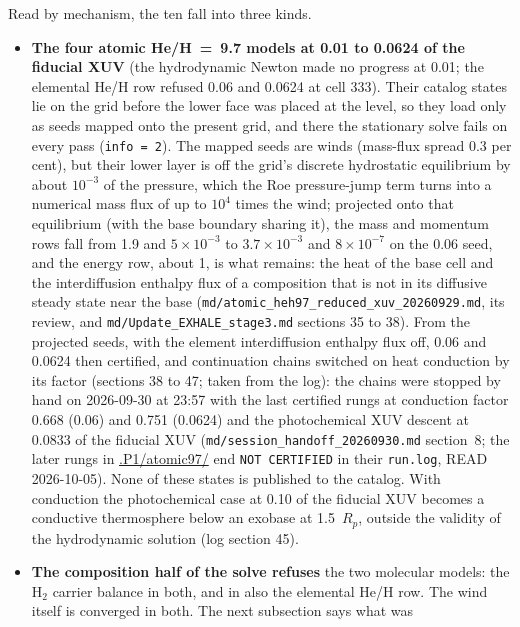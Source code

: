 \documentclass[11pt]{my_memo}
\newcommand{\case}[1]{\seqsplit{#1}}
\begin{document}
\noindent
Read by mechanism, the ten fall into three kinds.
\begin{itemize}
\item \textbf{The four atomic He/H~=~9.7 models at 0.01 to 0.0624 of the
      fiducial XUV} (the hydrodynamic Newton made no progress at 0.01; the
      elemental He/H row refused 0.06 and 0.0624 at cell 333). Their catalog
      states lie on the grid before the lower face was placed at the level,
      so they load only as seeds mapped onto the present grid, and there the
      stationary solve fails on every pass (\texttt{info~=~2}). The mapped
      seeds are winds (mass-flux spread 0.3 per cent), but their lower
      layer is off the grid's discrete hydrostatic equilibrium by about
      $10^{-3}$ of the pressure, which the Roe pressure-jump term turns into
      a numerical mass flux of up to $10^{4}$ times the wind; projected onto
      that equilibrium (with the base boundary sharing it), the mass and
      momentum rows fall from 1.9 and $5\times10^{-3}$ to
      $3.7\times10^{-3}$ and $8\times10^{-7}$ on the 0.06 seed, and the energy
      row, about 1, is what remains: the heat of the base cell and the
      interdiffusion enthalpy flux of a composition that is not in its
      diffusive steady state near the base
      (\texttt{md/atomic\_heh97\_reduced\_xuv\_20260929.md}, its review, and
      \texttt{md/Update\_EXHALE\_stage3.md} sections 35 to 38). From the
      projected seeds, with the element interdiffusion enthalpy flux off,
      0.06 and 0.0624 then certified, and continuation chains switched on
      heat conduction by its factor (sections 38 to 47; taken from the log):
      the chains were stopped by hand on 2026-09-30 at 23:57 with the last
      certified rungs at conduction factor 0.668 (0.06) and 0.751 (0.0624)
      and the photochemical XUV descent at 0.0833 of the fiducial XUV
      (\texttt{md/session\_handoff\_20260930.md} section~8; the later rungs
      in \url{.P1/atomic97/} end \texttt{NOT CERTIFIED} in their
      \texttt{run.log}, READ 2026-10-05). None of these states is published
      to the catalog. With conduction the photochemical case at 0.10 of
      the fiducial XUV becomes a conductive thermosphere below an exobase at
      1.5~$R_p$, outside the validity of the hydrodynamic solution (log
      section 45).
\item \textbf{The composition half of the solve refuses} the two
      molecular models: the H$_2$ carrier balance in both, and in
      \case{scalar\_kzz1e9/HeH0.083} also the elemental He/H row. The wind
      itself is converged in both. The next subsection says what was

\end{itemize}
\end{document}
